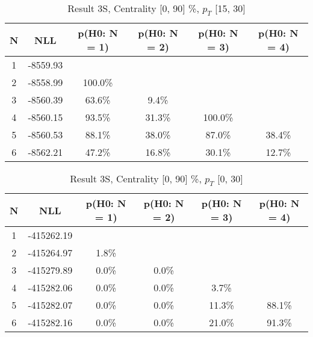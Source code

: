 \begin{table}[htb]
	\begin{center}
	\caption{Result 3S, Centrality [0, 90] \%, $p_{T}$ [15, 30] \GeV
}
{\footnotesize\renewcommand{\arraystretch}{1.4}
		\begin{tabular}{cc||>{\columncolor[gray]{0.8}}cccc}
			N & NLL & p(H0: N = 1) & p(H0: N = 2) & p(H0: N = 3) & p(H0: N = 4)\\ 
		\hline
1 & -8559.93 & & & & \\
2 & -8558.99 & 100.0\% & & & \\
3 & -8560.39 & 63.6\% & 9.4\% & & \\
4 & -8560.15 & 93.5\% & 31.3\% & 100.0\% & \\
5 & -8560.53 & 88.1\% & 38.0\% & 87.0\% & 38.4\% \\
6 & -8562.21 & 47.2\% & 16.8\% & 30.1\% & 12.7\% \\
	\end{tabular}
		\label{tab:lab}
	}
	\end{center}\end{table}

\begin{table}[htb]
	\begin{center}
	\caption{Result 3S, Centrality [0, 90] \%, $p_{T}$ [0, 30] \GeV
}
{\footnotesize\renewcommand{\arraystretch}{1.4}
		\begin{tabular}{cc||ccc>{\columncolor[gray]{0.8}}c}
			N & NLL & p(H0: N = 1) & p(H0: N = 2) & p(H0: N = 3) & p(H0: N = 4)\\ 
		\hline
1 & -415262.19 & & & & \\
2 & -415264.97 & 1.8\% & & & \\
3 & -415279.89 & 0.0\% & 0.0\% & & \\
4 & -415282.06 & 0.0\% & 0.0\% & 3.7\% & \\
5 & -415282.07 & 0.0\% & 0.0\% & 11.3\% & 88.1\% \\
6 & -415282.16 & 0.0\% & 0.0\% & 21.0\% & 91.3\% \\
	\end{tabular}
		\label{tab:lab}
	}
	\end{center}\end{table}

